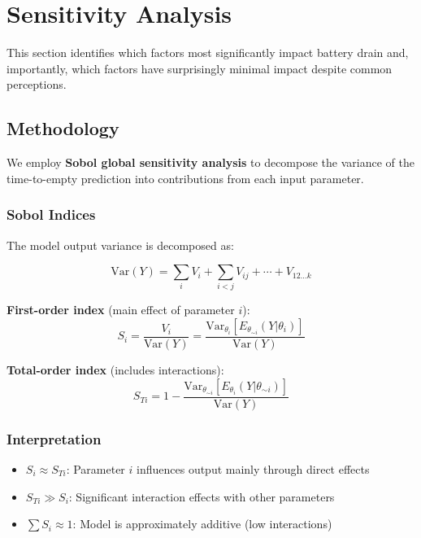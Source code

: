 \section{Sensitivity Analysis}
\label{sec:sensitivity}

This section identifies which factors most significantly impact battery drain and, importantly, which factors have surprisingly minimal impact despite common perceptions.

\subsection{Methodology}
\label{subsec:sensitivity_method}

We employ \textbf{Sobol global sensitivity analysis} \cite{Sobol2001, Saltelli2008} to decompose the variance of the time-to-empty prediction into contributions from each input parameter.

\subsubsection{Sobol Indices}

The model output variance is decomposed as:

\begin{equation}
    \text{Var}(Y) = \sum_i V_i + \sum_{i<j} V_{ij} + \cdots + V_{12\ldots k}
    \label{eq:variance_decomp}
\end{equation}

\textbf{First-order index} (main effect of parameter $i$):
\begin{equation}
    S_i = \frac{V_i}{\text{Var}(Y)} = \frac{\text{Var}_{\theta_i}\left[E_{\theta_{\sim i}}(Y|\theta_i)\right]}{\text{Var}(Y)}
    \label{eq:first_order}
\end{equation}

\textbf{Total-order index} (includes interactions):
\begin{equation}
    S_{Ti} = 1 - \frac{\text{Var}_{\theta_{\sim i}}\left[E_{\theta_i}(Y|\theta_{\sim i})\right]}{\text{Var}(Y)}
    \label{eq:total_order}
\end{equation}

\subsubsection{Interpretation}
\begin{itemize}
    \item $S_i \approx S_{Ti}$: Parameter $i$ influences output mainly through direct effects
    \item $S_{Ti} \gg S_i$: Significant interaction effects with other parameters
    \item $\sum S_i \approx 1$: Model is approximately additive (low interactions)
\end{itemize}

